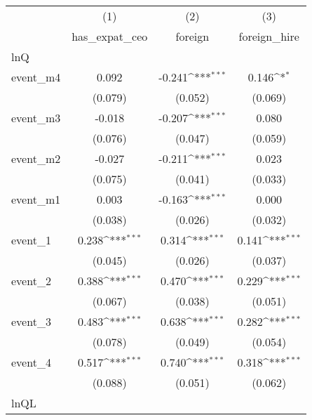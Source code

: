 {
\def\sym#1{\ifmmode^{#1}\else\(^{#1}\)\fi}
\begin{tabular}{l*{3}{c}}
\hline\hline
            &\multicolumn{1}{c}{(1)}&\multicolumn{1}{c}{(2)}&\multicolumn{1}{c}{(3)}\\
            &\multicolumn{1}{c}{has\_expat\_ceo}&\multicolumn{1}{c}{foreign}&\multicolumn{1}{c}{foreign\_hire}\\
\hline
lnQ         &                     &                     &                     \\
event\_m4    &       0.092         &      -0.241\sym{***}&       0.146\sym{*}  \\
            &     (0.079)         &     (0.052)         &     (0.069)         \\
[1em]
event\_m3    &      -0.018         &      -0.207\sym{***}&       0.080         \\
            &     (0.076)         &     (0.047)         &     (0.059)         \\
[1em]
event\_m2    &      -0.027         &      -0.211\sym{***}&       0.023         \\
            &     (0.075)         &     (0.041)         &     (0.033)         \\
[1em]
event\_m1    &       0.003         &      -0.163\sym{***}&       0.000         \\
            &     (0.038)         &     (0.026)         &     (0.032)         \\
[1em]
event\_1     &       0.238\sym{***}&       0.314\sym{***}&       0.141\sym{***}\\
            &     (0.045)         &     (0.026)         &     (0.037)         \\
[1em]
event\_2     &       0.388\sym{***}&       0.470\sym{***}&       0.229\sym{***}\\
            &     (0.067)         &     (0.038)         &     (0.051)         \\
[1em]
event\_3     &       0.483\sym{***}&       0.638\sym{***}&       0.282\sym{***}\\
            &     (0.078)         &     (0.049)         &     (0.054)         \\
[1em]
event\_4     &       0.517\sym{***}&       0.740\sym{***}&       0.318\sym{***}\\
            &     (0.088)         &     (0.051)         &     (0.062)         \\
\hline
lnQL        &                     &                     &                     \\

\end{tabular}}
